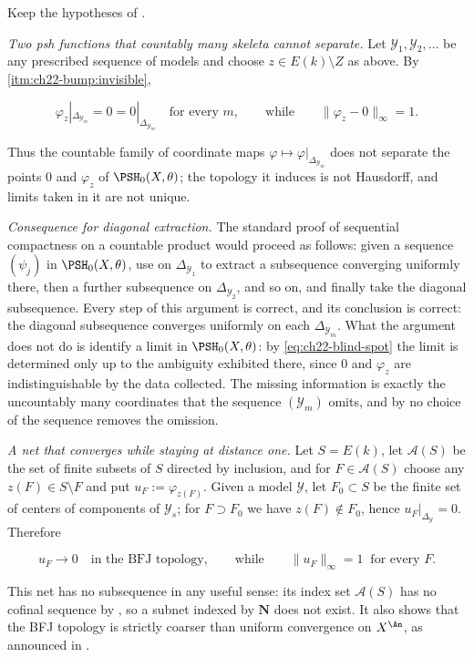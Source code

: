 \begin{example}
\label{ex:ch22-countable-blind-spot}
Keep the hypotheses of .

\emph{Two psh functions that countably many skeleta cannot separate.}  Let
\(\mathcal Y_1,\mathcal Y_2,\ldots\) be any prescribed sequence of models
and choose \(z\in E(k)\setminus Z\) as above.  By
\,\cref{itm:ch22-bump:invisible},

\[
 \varphi_z|_{\Delta_{\mathcal Y_m}}=0=0|_{\Delta_{\mathcal Y_m}}
 \quad\text{for every }m,
 \qquad\text{while}\qquad
 \|\varphi_z-0\|_{\infty}=1 .
\tag{22.70}\label{eq:ch22-blind-spot}
\]

Thus the countable family of coordinate maps
\(\varphi\mapsto\varphi|_{\Delta_{\mathcal Y_m}}\) does not separate the
points \(0\) and \(\varphi_z\) of \(\PSH_0(X,\theta)\); the topology it
induces is not Hausdorff, and limits taken in it are not unique.

\emph{Consequence for diagonal extraction.}  The standard proof of
sequential compactness on a countable product would proceed as follows:
given a sequence \((\psi_j)\) in \(\PSH_0(X,\theta)\), use
 on \(\Delta_{\mathcal Y_1}\) to extract a
subsequence converging uniformly there, then a further subsequence on
\(\Delta_{\mathcal Y_2}\), and so on, and finally take the diagonal
subsequence.  Every step of this argument is correct, and its conclusion is
correct: the diagonal subsequence converges uniformly on each
\(\Delta_{\mathcal Y_m}\).  What the argument does not do is identify a
limit in \(\PSH_0(X,\theta)\): by \eqref{eq:ch22-blind-spot} the limit is
determined only up to the ambiguity exhibited there, since \(0\) and
\(\varphi_z\) are indistinguishable by the data collected.  The missing
information is exactly the uncountably many coordinates that the sequence
\((\mathcal Y_m)\) omits, and by
 no choice of the sequence removes the
omission.

\emph{A net that converges while staying at distance one.}  Let \(S=E(k)\),
let \(\mathcal A(S)\) be the set of finite subsets of \(S\) directed by
inclusion, and for \(F\in\mathcal A(S)\) choose any \(z(F)\in S\setminus F\)
and put \(u_F:=\varphi_{z(F)}\).  Given a model \(\mathcal Y\), let
\(F_0\subset S\) be the finite set of centers of components of
\(\mathcal Y_s\); for \(F\supset F_0\) we have \(z(F)\notin F_0\), hence
\(u_F|_{\Delta_{\mathcal Y}}=0\).  Therefore

\[
 u_F\longrightarrow0
 \quad\text{in the BFJ topology},
 \qquad\text{while}\qquad
 \|u_F\|_\infty=1\ \text{ for every }F .
\tag{22.71}\label{eq:ch22-net-at-distance-one}
\]

This net has no subsequence in any useful sense: its index set
\(\mathcal A(S)\) has no cofinal sequence by
, so a subnet indexed by \(\mathbf N\) does not
exist.  It also shows that the BFJ topology is strictly coarser than
uniform convergence on \(X^{\An}\), as announced in
.
\end{example}

